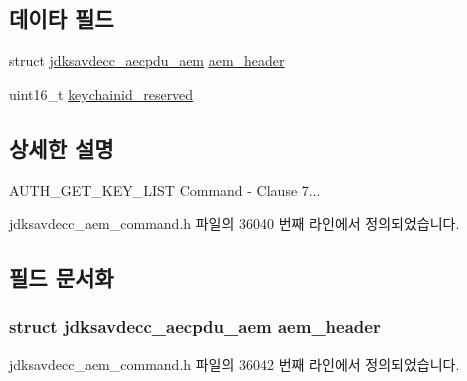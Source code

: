 \subsection*{데이타 필드}
\begin{DoxyCompactItemize}
\item 
struct \hyperlink{structjdksavdecc__aecpdu__aem}{jdksavdecc\+\_\+aecpdu\+\_\+aem} \hyperlink{structjdksavdecc__aem__command__auth__get__key__list_ae1e77ccb75ff5021ad923221eab38294}{aem\+\_\+header}
\item 
uint16\+\_\+t \hyperlink{structjdksavdecc__aem__command__auth__get__key__list_ae609f20a4491b73d052e406148b69438}{keychainid\+\_\+reserved}
\end{DoxyCompactItemize}


\subsection{상세한 설명}
A\+U\+T\+H\+\_\+\+G\+E\+T\+\_\+\+K\+E\+Y\+\_\+\+L\+I\+ST Command -\/ Clause 7... 

jdksavdecc\+\_\+aem\+\_\+command.\+h 파일의 36040 번째 라인에서 정의되었습니다.



\subsection{필드 문서화}
\subsubsection[{\texorpdfstring{aem\+\_\+header}{aem_header}}]{\setlength{\rightskip}{0pt plus 5cm}struct {\bf jdksavdecc\+\_\+aecpdu\+\_\+aem} aem\+\_\+header}\hypertarget{structjdksavdecc__aem__command__auth__get__key__list_ae1e77ccb75ff5021ad923221eab38294}{}\label{structjdksavdecc__aem__command__auth__get__key__list_ae1e77ccb75ff5021ad923221eab38294}


jdksavdecc\+\_\+aem\+\_\+command.\+h 파일의 36042 번째 라인에서 정의되었습니다.

